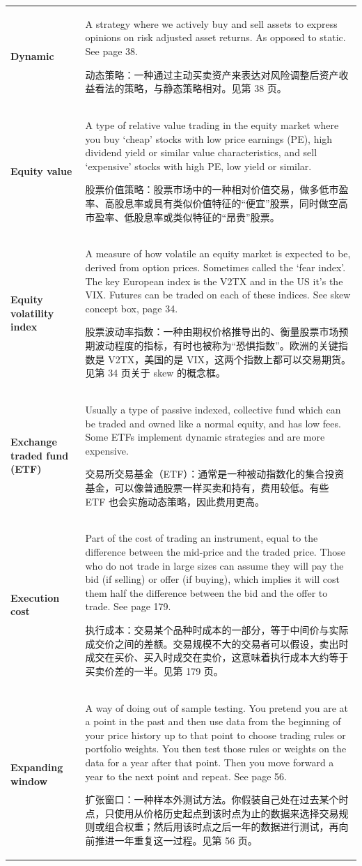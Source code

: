 \begin{chinesetableblock}
{\begin{longtable}{@{}>{\raggedright\arraybackslash\bfseries} p{}>{\raggedright\arraybackslash} p{}@{}}
Dynamic & A strategy where we actively buy and sell assets to express opinions on risk adjusted asset returns. As opposed to static. See page 38. \par 动态策略：一种通过主动买卖资产来表达对风险调整后资产收益看法的策略，与静态策略相对。见第 38 页。 \\[0.65em]
Equity value & A type of relative value trading in the equity market where you buy ‘cheap’ stocks with low price earnings (PE), high dividend yield or similar value characteristics, and sell ‘expensive’ stocks with high PE, low yield or similar. \par 股票价值策略：股票市场中的一种相对价值交易，做多低市盈率、高股息率或具有类似价值特征的“便宜”股票，同时做空高市盈率、低股息率或类似特征的“昂贵”股票。 \\[0.65em]
Equity volatility index & A measure of how volatile an equity market is expected to be, derived from option prices. Sometimes called the ‘fear index’. The key European index is the V2TX and in the US it’s the VIX. Futures can be traded on each of these indices. See skew concept box, page 34. \par 股票波动率指数：一种由期权价格推导出的、衡量股票市场预期波动程度的指标，有时也被称为“恐惧指数”。欧洲的关键指数是 V2TX，美国的是 VIX，这两个指数上都可以交易期货。见第 34 页关于 skew 的概念框。 \\[0.65em]
Exchange traded fund (ETF) & Usually a type of passive indexed, collective fund which can be traded and owned like a normal equity, and has low fees. Some ETFs implement dynamic strategies and are more expensive. \par 交易所交易基金（ETF）：通常是一种被动指数化的集合投资基金，可以像普通股票一样买卖和持有，费用较低。有些 ETF 也会实施动态策略，因此费用更高。 \\[0.65em]
Execution cost & Part of the cost of trading an instrument, equal to the difference between the mid-price and the traded price. Those who do not trade in large sizes can assume they will pay the bid (if selling) or offer (if buying), which implies it will cost them half the difference between the bid and the offer to trade. See page 179. \par 执行成本：交易某个品种时成本的一部分，等于中间价与实际成交价之间的差额。交易规模不大的交易者可以假设，卖出时成交在买价、买入时成交在卖价，这意味着执行成本大约等于买卖价差的一半。见第 179 页。 \\[0.65em]
Expanding window & A way of doing out of sample testing. You pretend you are at a point in the past and then use data from the beginning of your price history up to that point to choose trading rules or portfolio weights. You then test those rules or weights on the data for a year after that point. Then you move forward a year to the next point and repeat. See page 56. \par 扩张窗口：一种样本外测试方法。你假装自己处在过去某个时点，只使用从价格历史起点到该时点为止的数据来选择交易规则或组合权重；然后用该时点之后一年的数据进行测试，再向前推进一年重复这一过程。见第 56 页。 \\[0.65em]

\end{longtable}}
\end{chinesetableblock}
